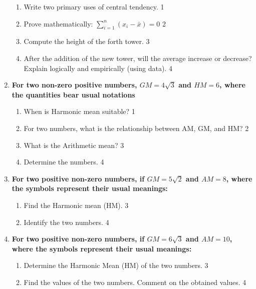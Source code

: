 \documentclass[a4paper,oneside]{book}
\begin{document}
\begin{enumerate}
  \begin{enumerate}
    \item
	Write two primary uses of central tendency. \hfill 1
    \item
	Prove mathematically: $\displaystyle \sum_{i=1}^n (x_i-\bar x) = 0$ \hfill 2
    \item  
	Compute the height of the forth tower. \hfill 3
    \item
	After the addition of the new tower, will the average increase or decrease? Explain logically and empirically (using data). \hfill 4
  \end{enumerate}

 \item
	  \textbf{For two non-zero positive numbers, $GM=4\sqrt3$ and $HM=6$, where the quantities bear usual notations} 
  
  \begin{enumerate}
    \item
	When is Harmonic mean suitable? \hfill 1
    \item
	For two numbers, what is the relationship between AM, GM, and HM? \hfill 2
    \item  
	What is the Arithmetic mean? \hfill 3
    \item
	Determine the numbers. \hfill 4
  \end{enumerate}
  
  \item
\textbf{For two positive non-zero numbers, if $GM = 5\sqrt{2}$ and $AM = 8$, where the symbols represent their usual meanings:}

\begin{enumerate}
    \item  
    Find the Harmonic mean (HM). \hfill 3
    \item
    Identify the two numbers. \hfill 4
\end{enumerate}

\item
\textbf{For two positive non-zero numbers, if $GM = 6\sqrt{3}$ and $AM = 10$, where the symbols represent their usual meanings:}

\begin{enumerate}
    \item  
    Determine the Harmonic Mean (HM) of the two numbers. \hfill 3
    \item
    Find the values of the two numbers. Comment on the obtained values. \hfill 4
\end{enumerate}


\end{enumerate}
\end{document}
